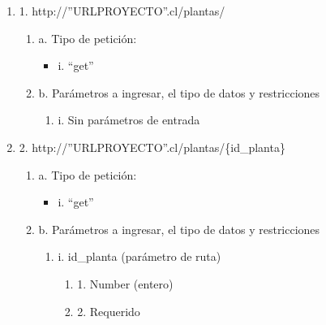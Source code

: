 \begin{enumerate}
    \item 1. http://”URLPROYECTO”.cl/plantas/
    \begin{enumerate}
        \item a. Tipo de petición:
            \begin{itemize}
               \item i. “get”
            \end{itemize}
        \item b. Parámetros a ingresar, el tipo de datos y restricciones
            \begin{enumerate}
                \item i. Sin parámetros de entrada
            \end{enumerate}
    \end{enumerate}

    \item 2. http://”URLPROYECTO”.cl/plantas/\{id\_planta\}
    \begin{enumerate}
        \item a. Tipo de petición:
            \begin{itemize}
               \item i. “get”
            \end{itemize}
        \item b. Parámetros a ingresar, el tipo de datos y restricciones
            \begin{enumerate}
                \item i. id\_planta (parámetro de ruta)
                    \begin{enumerate}
                        \item 1. Number (entero)
                        \item 2. Requerido
                    \end{enumerate}
            \end{enumerate}
    \end{enumerate}


\end{enumerate}
